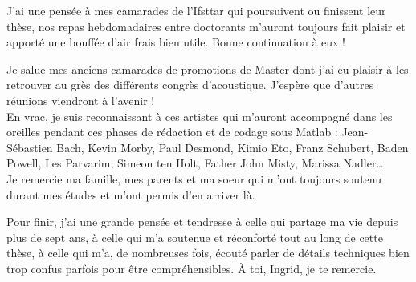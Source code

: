 J'ai une pensée à mes camarades de l'Ifsttar qui poursuivent ou finissent leur thèse, nos repas hebdomadaires entre doctorants m'auront toujours fait plaisir et apporté une bouffée d'air frais bien utile. Bonne continuation à eux !

Je salue mes anciens camarades de promotions de Master dont j'ai eu plaisir à les retrouver au grès des différents congrès d'acoustique. J'espère que d'autres réunions viendront à l'avenir !\\

En vrac, je suis reconnaissant à ces artistes qui m'auront accompagné dans les oreilles pendant ces phases de rédaction et de codage sous Matlab : Jean-Sébastien Bach, Kevin Morby, Paul Desmond, Kimio Eto, Franz Schubert, Baden Powell, Les Parvarim, Simeon ten Holt, Father John Misty, Marissa Nadler\dots\\

Je remercie ma famille, mes parents et ma soeur qui m'ont toujours soutenu durant mes études et m'ont permis d'en arriver là.

Pour finir, j'ai une grande pensée et tendresse à celle qui partage ma vie depuis plus de sept ans, à celle qui m'a soutenue et réconforté tout au long de cette thèse, à celle qui m'a, de nombreuses fois, écouté parler de détails techniques bien trop confus parfois pour être compréhensibles. \`A toi, Ingrid, je te remercie.\\


